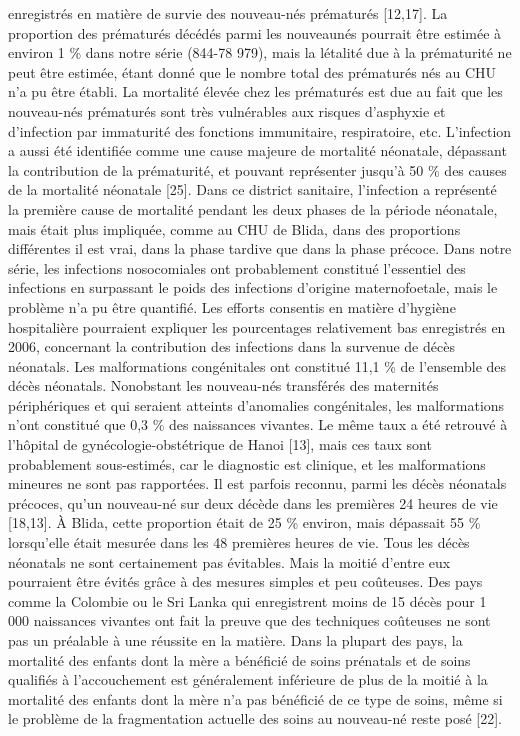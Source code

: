 \documentclass[
]{book}
\begin{document}
enregistrés en matière de survie des nouveau-nés prématurés
{[}12,17{]}.
La proportion des prématurés décédés parmi les nouveaunés
pourrait être estimée à environ 1 \% dans notre série
(844-78 979), mais la létalité due à la prématurité ne peut être
estimée, étant donné que le nombre total des prématurés nés
au CHU n'a pu être établi. La mortalité élevée chez les
prématurés est due au fait que les nouveau-nés prématurés
sont très vulnérables aux risques d'asphyxie et d'infection
par immaturité des fonctions immunitaire, respiratoire, etc.
L'infection a aussi été identifiée comme une cause
majeure de mortalité néonatale, dépassant la contribution
de la prématurité, et pouvant représenter jusqu'à 50 \% des
causes de la mortalité néonatale {[}25{]}. Dans ce district
sanitaire, l'infection a représenté la première cause de
mortalité pendant les deux phases de la période néonatale,
mais était plus impliquée, comme au CHU de Blida, dans des
proportions différentes il est vrai, dans la phase tardive que
dans la phase précoce. Dans notre série, les infections
nosocomiales ont probablement constitué l'essentiel des
infections en surpassant le poids des infections d'origine
maternofoetale, mais le problème n'a pu être quantifié. Les
efforts consentis en matière d'hygiène hospitalière pourraient
expliquer les pourcentages relativement bas enregistrés en
2006, concernant la contribution des infections dans la
survenue de décès néonatals.
Les malformations congénitales ont constitué 11,1 \% de
l'ensemble des décès néonatals. Nonobstant les nouveau-nés
transférés des maternités périphériques et qui seraient
atteints d'anomalies congénitales, les malformations n'ont
constitué que 0,3 \% des naissances vivantes. Le même taux
a été retrouvé à l'hôpital de gynécologie-obstétrique de
Hanoi {[}13{]}, mais ces taux sont probablement sous-estimés,
car le diagnostic est clinique, et les malformations mineures
ne sont pas rapportées. Il est parfois reconnu, parmi les
décès néonatals précoces, qu'un nouveau-né sur deux
décède dans les premières 24 heures de vie {[}18,13{]}. À
Blida, cette proportion était de 25 \% environ, mais dépassait
55 \% lorsqu'elle était mesurée dans les 48 premières
heures de vie.
Tous les décès néonatals ne sont certainement pas
évitables. Mais la moitié d'entre eux pourraient être évités
grâce à des mesures simples et peu coûteuses. Des pays
comme la Colombie ou le Sri Lanka qui enregistrent moins
de 15 décès pour 1 000 naissances vivantes ont fait la preuve
que des techniques coûteuses ne sont pas un préalable à une
réussite en la matière. Dans la plupart des pays, la mortalité
des enfants dont la mère a bénéficié de soins prénatals et de
soins qualifiés à l'accouchement est généralement inférieure
de plus de la moitié à la mortalité des enfants dont la mère n'a
pas bénéficié de ce type de soins, même si le problème de
la fragmentation actuelle des soins au nouveau-né reste
posé {[}22{]}.
\end{document}
